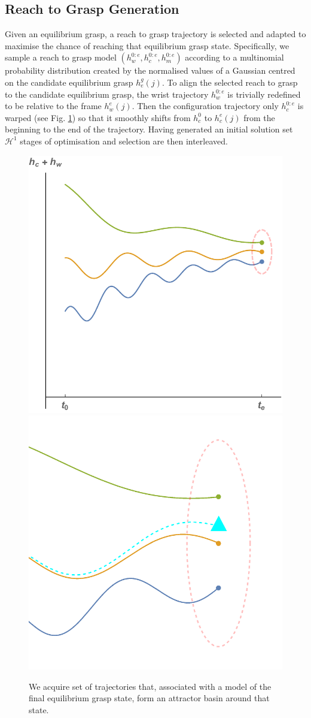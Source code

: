 \subsection{Reach to Grasp Generation}
Given an equilibrium grasp, a reach to grasp trajectory is selected and adapted to maximise the chance of reaching that equilibrium grasp state. Specifically, we sample a reach to grasp model $(h_w^{0:e} , h_c^{0:e} , h_m^{0:e})$ according to a multinomial probability distribution created by the normalised values of a Gaussian centred on the candidate equilibrium grasp $h_e^g(j)$. To align the selected reach to grasp to the candidate equilibrium grasp, the wrist trajectory $h_w^{0:e}$ is trivially redefined to be relative to the frame $h_w^{e}(j)$. Then the configuration trajectory only $h_c^{0:e}$ is warped (see Fig. \ref{fig:reaches}) so that it smoothly shifts from $h_c^{0}$ to $h_c^{e}(j)$ from the beginning to the end of the trajectory. 
Having generated an initial solution set $\mathcal{H}^{1}$ stages of optimisation and selection are then interleaved.

\begin{figure}

 \includegraphics[width=0.45\linewidth]{images/config_space_plots/2_basin_of_attraction}
  \includegraphics[width=0.45\linewidth]{images/config_space_plots/5_trajectory_adaptation}
 \caption{{We acquire set of trajectories that, associated with a model of the final equilibrium grasp state, form an attractor basin around that state.}}
  \label{fig:reaches}
\end{figure}

